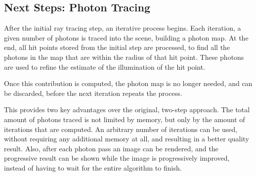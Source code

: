 \documentclass[main.tex]{subfiles}
\begin{document}
\subsection{Next Steps: Photon Tracing}

After the initial ray tracing step, an iterative process begins. Each iteration, a given number of photons is traced into the scene, building a photon map. At the end, all hit points stored from the initial step are processed, to find all the photons in the map that are within the radius of that hit point. These photons are used to refine the estimate of the illumination of the hit point.

Once this contribution is computed, the photon map is no longer needed, and can be discarded, before the next iteration repeats the process.

This provides two key advantages over the original, two-step approach. The total amount of photons traced is not limited by memory, but only by the amount of iterations that are computed. An arbitrary number of iterations can be used, without requiring any additional memory at all, and resulting in a better quality result. Also, after each photon pass an image can be rendered, and the progressive result can be shown while the image is progressively improved, instead of having to wait for the entire algorithm to finish.
\end{document}
